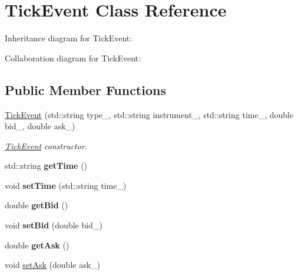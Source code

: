 \hypertarget{classTickEvent}{}\section{Tick\+Event Class Reference}
\label{classTickEvent}


Inheritance diagram for Tick\+Event\+:


Collaboration diagram for Tick\+Event\+:
\subsection*{Public Member Functions}
\begin{DoxyCompactItemize}
\item 
\hyperlink{classTickEvent_a92489fb2cd6a3c6fece688ba3eed450e}{Tick\+Event} (std\+::string type\+\_\+, std\+::string instrument\+\_\+, std\+::string time\+\_\+, double bid\+\_\+, double ask\+\_\+)
\begin{DoxyCompactList}\small\item\em \hyperlink{classTickEvent}{Tick\+Event} constructor. \end{DoxyCompactList}\item 
std\+::string {\bfseries get\+Time} ()\hypertarget{classTickEvent_a2a93e367088911b1e5f52a4c5cecfb09}{}\label{classTickEvent_a2a93e367088911b1e5f52a4c5cecfb09}

\item 
void {\bfseries set\+Time} (std\+::string time\+\_\+)\hypertarget{classTickEvent_ac7e956c619d8afdc45bef96dd3ac3024}{}\label{classTickEvent_ac7e956c619d8afdc45bef96dd3ac3024}

\item 
double {\bfseries get\+Bid} ()\hypertarget{classTickEvent_a4ac3847fbb9daf9b9c465fa6f5203c67}{}\label{classTickEvent_a4ac3847fbb9daf9b9c465fa6f5203c67}

\item 
void {\bfseries set\+Bid} (double bid\+\_\+)\hypertarget{classTickEvent_a3922cd464f29dcebc00f6811051ce8b6}{}\label{classTickEvent_a3922cd464f29dcebc00f6811051ce8b6}

\item 
double {\bfseries get\+Ask} ()\hypertarget{classTickEvent_a7401ad754018b0ef4c9d90f33cfabff5}{}\label{classTickEvent_a7401ad754018b0ef4c9d90f33cfabff5}

\item 
void \hyperlink{classTickEvent_ae5e8486ece8ce86ee7432efde9622a12}{set\+Ask} (double ask\+\_\+)
\end{DoxyCompactItemize}
